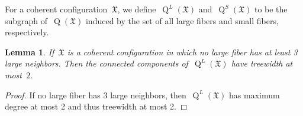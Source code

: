\documentclass[english,a4paper]{article}
\theoremstyle{plain}
\newtheorem{lemma}      [theorem]{Lemma}
\theoremstyle{definition}
\newcommand{\coherentConfig}{\ensuremath{\mathfrak{X}}}
\DeclareMathOperator*{\Quotient}{Q}
\newcommand{\quotientGraph}[1]{\ensuremath{\Quotient(#1)}}
\newcommand{\quotientGraphLarge}[1]{\ensuremath{\Quotient^L(#1)}}
\newcommand{\quotientGraphSmall}[1]{\ensuremath{\Quotient^S(#1)}}
\begin{document}
For a coherent configuration~$\coherentConfig$, we define~$\quotientGraphLarge{\coherentConfig}$ and~$\quotientGraphSmall{\coherentConfig}$ to be the subgraph of~$\quotientGraph{\coherentConfig}$ induced by the set of all large fibers and small fibers, respectively.


\begin{lemma}\label{lem:max:degree:2:means:tw:3}
    If~$\coherentConfig$ is a coherent configuration in which no large fiber has at least 3 large neighbors.
    Then the connected components of~$\quotientGraphLarge{\coherentConfig}$ have treewidth at most~$2$.
\end{lemma}

\begin{proof}
    If no large fiber has 3 large neighbors, then~$\quotientGraphLarge{\coherentConfig}$ has maximum degree at most 2 and thus treewidth at most 2.
\end{proof}
\end{document}

